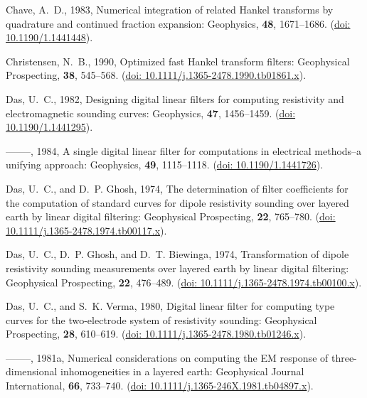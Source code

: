 \documentclass[paper,twocolumn,twoside]{geophysics}
\begin{document}
\begin{thebibliography}{}
Chave, A.~D.,  1983, Numerical integration of related {H}ankel transforms by
  quadrature and continued fraction expansion: Geophysics, {\bf 48},
  1671--1686.
\newblock (\href{http://doi.org/10.1190/1.1441448}{doi: 10.1190/1.1441448}).

Christensen, N.~B.,  1990, Optimized fast {H}ankel transform filters:
  Geophysical Prospecting, {\bf 38}, 545--568.
\newblock (\href{http://doi.org/10.1111/j.1365-2478.1990.tb01861.x}{doi:
  10.1111/j.1365-2478.1990.tb01861.x}).

Das, U.~C.,  1982, Designing digital linear filters for computing resistivity
  and electromagnetic sounding curves: Geophysics, {\bf 47}, 1456--1459.
\newblock (\href{https://doi.org/10.1190/1.1441295}{doi: 10.1190/1.1441295}).

--------, 1984, A single digital linear filter for computations in electrical
  methods--a unifying approach: Geophysics, {\bf 49}, 1115--1118.
\newblock (\href{https://doi.org/10.1190/1.1441726}{doi: 10.1190/1.1441726}).

Das, U.~C., and D.~P. Ghosh,  1974, The determination of filter coefficients
  for the computation of standard curves for dipole resistivity sounding over
  layered earth by linear digital filtering: Geophysical Prospecting, {\bf 22},
  765--780.
\newblock (\href{http://doi.org/10.1111/j.1365-2478.1974.tb00117.x}{doi:
  10.1111/j.1365-2478.1974.tb00117.x}).

Das, U.~C., D.~P. Ghosh, and D.~T. Biewinga,  1974, Transformation of dipole
  resistivity sounding measurements over layered earth by linear digital
  filtering: Geophysical Prospecting, {\bf 22}, 476--489.
\newblock (\href{http://doi.org/10.1111/j.1365-2478.1974.tb00100.x}{doi:
  10.1111/j.1365-2478.1974.tb00100.x}).

Das, U.~C., and S.~K. Verma,  1980, Digital linear filter for computing type
  curves for the two-electrode system of resistivity sounding: Geophysical
  Prospecting, {\bf 28}, 610--619.
\newblock (\href{http://doi.org/10.1111/j.1365-2478.1980.tb01246.x}{doi:
  10.1111/j.1365-2478.1980.tb01246.x}).

--------, 1981a, Numerical considerations on computing the {EM} response of
  three-dimensional inhomogeneities in a layered earth: Geophysical Journal
  International, {\bf 66}, 733--740.
\newblock (\href{http://doi.org/10.1111/j.1365-246X.1981.tb04897.x}{doi:
  10.1111/j.1365-246X.1981.tb04897.x}).


\end{thebibliography}
\end{document}
